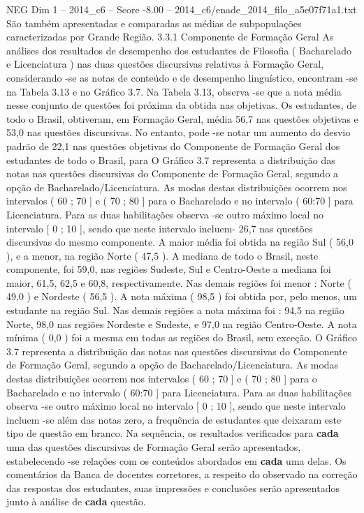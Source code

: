 \begin{textsample}{NEG Dim 1 – 2014\_c6 – Score -8.00 – 2014\_c6/enade\_2014\_filo\_a5e07f71a1.txt}
São também apresentadas e comparadas as médias de subpopulações caracterizadas por Grande Região. 3.3.1 Componente de Formação Geral As análises dos resultados de desempenho dos estudantes de Filosofia ( Bacharelado e Licenciatura ) nas duas questões discursivas relativas à Formação Geral, considerando -se as notas de conteúdo e de desempenho linguístico, encontram -se na Tabela 3.13 e no Gráfico 3.7.
Na Tabela 3.13, observa -se que a nota média nesse conjunto de questões foi próxima da obtida nas objetivas.
Os estudantes, de todo o Brasil, obtiveram, em Formação Geral, média 56,7 nas questões objetivas e 53,0 nas questões discursivas.
No entanto, pode -se notar um aumento do desvio padrão de 22,1 nas questões objetivas do Componente de Formação Geral dos estudantes de todo o Brasil, para O Gráfico 3.7 representa a distribuição das notas nas questões discursivas do Componente de Formação Geral, segundo a opção de Bacharelado/Licenciatura.
As modas destas distribuições ocorrem nos intervalos ( 60 ; 70 ] e ( 70 ; 80 ] para o Bacharelado e no intervalo ( 60:70 ] para Licenciatura.
Para as duas habilitações observa -se outro máximo local no intervalo [ 0 ; 10 ], sendo que neste intervalo incluem- 26,7 nas questões discursivas do mesmo componente.
A maior média foi obtida na região Sul ( 56,0 ), e a menor, na região Norte ( 47,5 ).
A mediana de todo o Brasil, neste componente, foi 59,0, nas regiões Sudeste, Sul e Centro-Oeste a mediana foi maior, 61,5, 62,5 e 60,8, respectivamente.
Nas demais regiões foi menor : Norte ( 49,0 ) e Nordeste ( 56,5 ).
A nota máxima ( 98,5 ) foi obtida por, pelo menos, um estudante na região Sul.
Nas demais regiões a nota máxima foi : 94,5 na região Norte, 98,0 nas regiões Nordeste e Sudeste, e 97,0 na região Centro-Oeste.
A nota mínima ( 0,0 ) foi a mesma em todas as regiões do Brasil, sem exceção.
O Gráfico 3.7 representa a distribuição das notas nas questões discursivas do Componente de Formação Geral, segundo a opção de Bacharelado/Licenciatura.
As modas destas distribuições ocorrem nos intervalos ( 60 ; 70 ] e ( 70 ; 80 ] para o Bacharelado e no intervalo ( 60:70 ] para Licenciatura.
Para as duas habilitações observa -se outro máximo local no intervalo [ 0 ; 10 ], sendo que neste intervalo incluem -se além das notas zero, a frequência de estudantes que deixaram este tipo de questão em branco.
Na sequência, os resultados verificados para \textbf{cada} uma das questões discursivas de Formação Geral serão apresentados, estabelecendo -se relações com os conteúdos abordados em \textbf{cada} uma delas.
Os comentários da Banca de docentes corretores, a respeito do observado na correção das respostas dos estudantes, suas impressões e conclusões serão apresentados junto à análise de \textbf{cada} questão.

\end{textsample}
